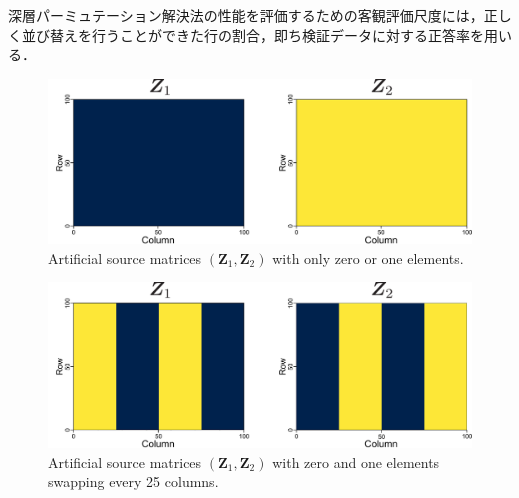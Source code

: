 深層パーミュテーション解決法の性能を評価するための客観評価尺度には，正しく並び替えを行うことができた行の割合，即ち検証データに対する正答率を用いる．
\begin{figure}[t]
  \begin{center}
      \includegraphics[width=0.95\columnwidth]{figures/origi_spec/01mat.pdf}
  \end{center}
\caption{Artificial source matrices $(\bm{Z}_1, \bm{Z}_2)$ with only zero or one elements.}
\label{fig:01mat_spec}
\end{figure}

\begin{figure}[t]
  \begin{center}
      \includegraphics[width=0.95\columnwidth]{figures/origi_spec/25stripe.pdf}
  \end{center}
\caption{Artificial source matrices $(\bm{Z}_1, \bm{Z}_2)$ with zero and one elements swapping every 25 columns.}
\label{fig:25stripe_spec}
\end{figure}

